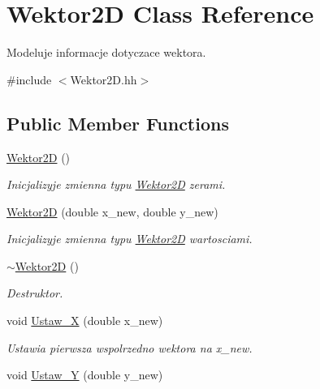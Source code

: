 \hypertarget{class_wektor2_d}{\section{Wektor2\+D Class Reference}
\label{class_wektor2_d}
}


Modeluje informacje dotyczace wektora.  




{\ttfamily \#include $<$Wektor2\+D.\+hh$>$}

\subsection*{Public Member Functions}
\begin{DoxyCompactItemize}
\item 
\hypertarget{class_wektor2_d_a0033c26592fddb39e1ae856f1356934c}{\hyperlink{class_wektor2_d_a0033c26592fddb39e1ae856f1356934c}{Wektor2\+D} ()}\label{class_wektor2_d_a0033c26592fddb39e1ae856f1356934c}

\begin{DoxyCompactList}\small\item\em Inicjalizyje zmienna typu \hyperlink{class_wektor2_d}{Wektor2\+D} zerami. \end{DoxyCompactList}\item 
\hyperlink{class_wektor2_d_a731c3a68d9c7d209cc4d130e7d26b488}{Wektor2\+D} (double x\+\_\+new, double y\+\_\+new)
\begin{DoxyCompactList}\small\item\em Inicjalizyje zmienna typu \hyperlink{class_wektor2_d}{Wektor2\+D} wartosciami. \end{DoxyCompactList}\item 
\hyperlink{class_wektor2_d_a7f1dbc81d52c6ecb8788d3b55234aa94}{$\sim$\+Wektor2\+D} ()
\begin{DoxyCompactList}\small\item\em Destruktor. \end{DoxyCompactList}\item 
\hypertarget{class_wektor2_d_a1335fe5aa19f0d521a0c87857ba42f65}{void \hyperlink{class_wektor2_d_a1335fe5aa19f0d521a0c87857ba42f65}{Ustaw\+\_\+\+X} (double x\+\_\+new)}\label{class_wektor2_d_a1335fe5aa19f0d521a0c87857ba42f65}

\begin{DoxyCompactList}\small\item\em Ustawia pierwsza wspolrzedno wektora na x\+\_\+new. \end{DoxyCompactList}\item 
\hypertarget{class_wektor2_d_aa94255dc07581b89f76145869d8619db}{void \hyperlink{class_wektor2_d_aa94255dc07581b89f76145869d8619db}{Ustaw\+\_\+\+Y} (double y\+\_\+new)}\label{class_wektor2_d_aa94255dc07581b89f76145869d8619db}


\end{DoxyCompactItemize}

